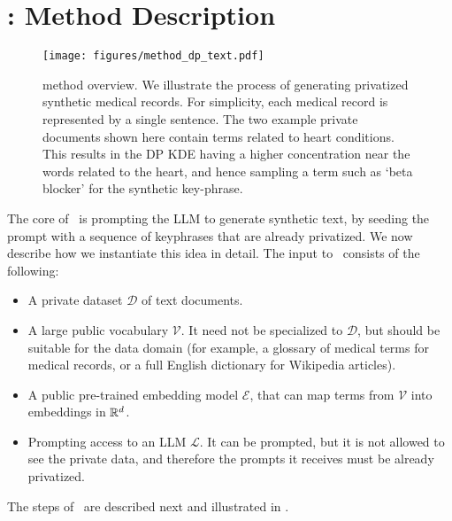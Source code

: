 \section{\alg: Method Description}\label{sec:method_main}

\begin{figure}
    \begin{center}
        \texttt{[image: figures/method\_dp\_text.pdf]}
        \captionsetup{font=footnotesize}
        \caption{\textbf{\alg} method overview. We illustrate the process of generating privatized synthetic medical records. For simplicity, each medical record is represented by a single sentence. The two example private documents shown here contain terms related to heart conditions. This results in the DP KDE having a higher concentration near the words related to the heart, and  hence sampling a term such as `beta blocker' for the synthetic key-phrase.} 
        \label{fig:detailedmethod}
    \end{center}
\vspace{-0.15 in}
\end{figure}

The core of \alg\ is prompting the LLM to generate synthetic text, by seeding the prompt with a sequence of keyphrases that are already privatized. 
We now describe how we instantiate this idea in detail.
%
The input to \alg\ consists of the following:
\begin{itemize}
 \item A private dataset $\mathcal{D}$ of text documents.
 \item A large public vocabulary $\mathcal{V}$. It need not be specialized to $\mathcal{D}$, but should be suitable for the data domain (for example, a glossary of medical terms for medical records, or a full English dictionary for Wikipedia articles).
 \item A public pre-trained embedding model $\mathcal{E}$, that can map terms from $\mathcal{V}$ into embeddings in $\mathbb R^d$. 
 \item Prompting access to an LLM $\mathcal L$. It can be prompted, but it is not allowed to see the private data, and therefore the prompts it receives must be already privatized.
\end{itemize}
The steps of \alg~are described next and illustrated in .

